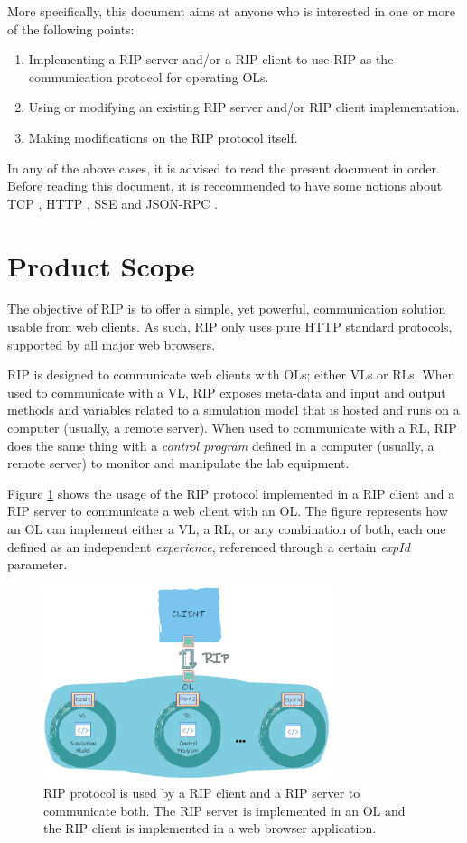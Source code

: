 More specifically, this document aims at anyone who is interested in one or more of the following points:

\begin{enumerate}
    \item Implementing a RIP server and/or a RIP client to use RIP as the communication protocol for operating OLs.
    \item Using or modifying an existing RIP server and/or RIP client implementation.
    \item Making modifications on the RIP protocol itself.
\end{enumerate}

In any of the above cases, it is advised to read the present document in order. Before reading this document, it is reccommended to have some notions about TCP \cite{tcp}, HTTP \cite{http}, SSE \cite{sse} and JSON-RPC \cite{jsonrpc}.

\section{Product Scope}
The objective of RIP is to offer a simple, yet powerful, communication solution usable from web clients. As such, RIP only uses pure HTTP standard protocols, supported by all major web browsers.

RIP is designed to communicate web clients with OLs; either VLs or RLs. When used to communicate with a VL, RIP exposes meta-data and input and output methods and variables related to a simulation model that is hosted and runs on a computer (usually, a remote server). When used to communicate with a RL, RIP does the same thing with a \textit{control program} defined in a computer (usually, a remote server) to monitor and manipulate the lab equipment.

Figure \ref{fig:Client-RIP-OL} shows the usage of the RIP protocol implemented in a RIP client and a RIP server to communicate a web client with an OL. The figure represents how an OL can implement either a VL, a RL, or any combination of both, each one defined as an independent \textit{experience}, referenced through a certain \textit{expId} parameter.

\begin{figure}
\centering
\includegraphics[width=0.75\textwidth]{images/Client-RIP-OL.pdf}
\caption{RIP protocol is used by a RIP client and a RIP server to communicate both. The RIP server is implemented in an OL and the RIP client is implemented in a web browser application.}
\label{fig:Client-RIP-OL}
\end{figure}


